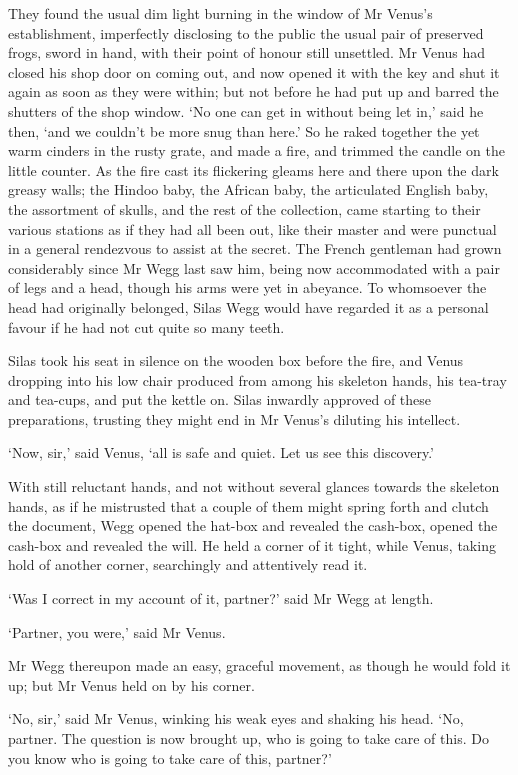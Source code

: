 They found the usual dim light burning in the window of Mr Venus’s
establishment, imperfectly disclosing to the public the usual pair
of preserved frogs, sword in hand, with their point of honour still
unsettled. Mr Venus had closed his shop door on coming out, and now
opened it with the key and shut it again as soon as they were within;
but not before he had put up and barred the shutters of the shop window.
‘No one can get in without being let in,’ said he then, ‘and we couldn’t
be more snug than here.’ So he raked together the yet warm cinders in
the rusty grate, and made a fire, and trimmed the candle on the little
counter. As the fire cast its flickering gleams here and there upon the
dark greasy walls; the Hindoo baby, the African baby, the articulated
English baby, the assortment of skulls, and the rest of the collection,
came starting to their various stations as if they had all been out,
like their master and were punctual in a general rendezvous to assist
at the secret. The French gentleman had grown considerably since Mr Wegg
last saw him, being now accommodated with a pair of legs and a head,
though his arms were yet in abeyance. To whomsoever the head had
originally belonged, Silas Wegg would have regarded it as a personal
favour if he had not cut quite so many teeth.

Silas took his seat in silence on the wooden box before the fire, and
Venus dropping into his low chair produced from among his skeleton
hands, his tea-tray and tea-cups, and put the kettle on. Silas inwardly
approved of these preparations, trusting they might end in Mr Venus’s
diluting his intellect.

‘Now, sir,’ said Venus, ‘all is safe and quiet. Let us see this
discovery.’

With still reluctant hands, and not without several glances towards the
skeleton hands, as if he mistrusted that a couple of them might spring
forth and clutch the document, Wegg opened the hat-box and revealed the
cash-box, opened the cash-box and revealed the will. He held a corner
of it tight, while Venus, taking hold of another corner, searchingly and
attentively read it.

‘Was I correct in my account of it, partner?’ said Mr Wegg at length.

‘Partner, you were,’ said Mr Venus.

Mr Wegg thereupon made an easy, graceful movement, as though he would
fold it up; but Mr Venus held on by his corner.

‘No, sir,’ said Mr Venus, winking his weak eyes and shaking his head.
‘No, partner. The question is now brought up, who is going to take care
of this. Do you know who is going to take care of this, partner?’

